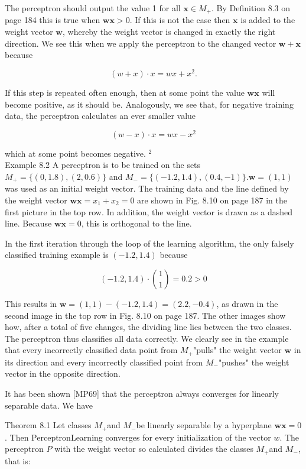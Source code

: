 \documentclass[10pt]{article}
\begin{document}
The perceptron should output the value 1 for all $\boldsymbol{x} \in M_{+}$. By Definition 8.3 on page 184 this is true when $\boldsymbol{w} \boldsymbol{x}>0$. If this is not the case then $\boldsymbol{x}$ is added to the weight vector $\boldsymbol{w}$, whereby the weight vector is changed in exactly the right direction. We see this when we apply the perceptron to the changed vector $\boldsymbol{w}+\boldsymbol{x}$ because

$$
(w+x) \cdot x=w x+x^{2} .
$$

If this step is repeated often enough, then at some point the value $\boldsymbol{w} \boldsymbol{x}$ will become positive, as it should be. Analogously, we see that, for negative training data, the perceptron calculates an ever smaller value

$$
(w-x) \cdot x=w x-x^{2}
$$

which at some point becomes negative. ${ }^{2}$\\
Example 8.2 A perceptron is to be trained on the sets $M_{+}=\{(0,1.8),(2,0.6)\}$ and $M_{-}=\{(-1.2,1.4),(0.4,-1)\} . \boldsymbol{w}=(1,1)$ was used as an initial weight vector. The training data and the line defined by the weight vector $\boldsymbol{w} \boldsymbol{x}=x_{1}+x_{2}=0$ are shown in Fig. 8.10 on page 187 in the first picture in the top row. In addition, the weight vector is drawn as a dashed line. Because $\boldsymbol{w} \boldsymbol{x}=0$, this is orthogonal to the line.

In the first iteration through the loop of the learning algorithm, the only falsely classified training example is $(-1.2,1.4)$ because

$$
(-1.2,1.4) \cdot\binom{1}{1}=0.2>0
$$

This results in $\boldsymbol{w}=(1,1)-(-1.2,1.4)=(2.2,-0.4)$, as drawn in the second image in the top row in Fig. 8.10 on page 187. The other images show how, after a total of five changes, the dividing line lies between the two classes. The perceptron thus classifies all data correctly. We clearly see in the example that every incorrectly classified data point from $M_{+}$"pulls" the weight vector $\boldsymbol{w}$ in its direction and every incorrectly classified point from $M_{-}$"pushes" the weight vector in the opposite direction.

It has been shown [MP69] that the perceptron always converges for linearly separable data. We have

Theorem 8.1 Let classes $M_{+}$and $M_{-}$be linearly separable by a hyperplane $\boldsymbol{w} \boldsymbol{x}=0$. Then PerceptronLearning converges for every initialization of the vector $w$. The perceptron $P$ with the weight vector so calculated divides the classes $M_{+}$and $M_{-}$, that is:
\end{document}
